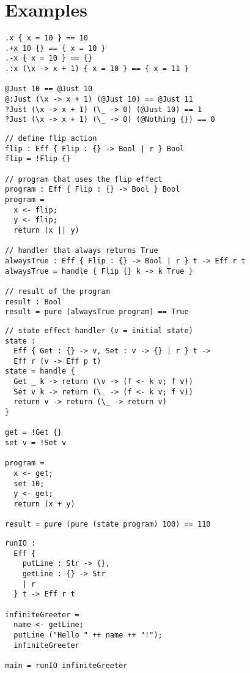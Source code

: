 \documentclass[12pt]{article}
\begin{document}
\newpage
\section{Examples}

\begin{lstlisting}[caption=Records and variants]
.x { x = 10 } == 10
.+x 10 {} == { x = 10 }
.-x { x = 10 } == {}
.:x (\x -> x + 1) { x = 10 } == { x = 11 }

@Just 10 == @Just 10
@:Just (\x -> x + 1) (@Just 10) == @Just 11
?Just (\x -> x + 1) (\_ -> 0) (@Just 10) == 1
?Just (\x -> x + 1) (\_ -> 0) (@Nothing {}) == 0
\end{lstlisting}

\begin{lstlisting}[caption=Basic effect handlers]
// define flip action
flip : Eff { Flip : {} -> Bool | r } Bool
flip = !Flip {}

// program that uses the flip effect
program : Eff { Flip : {} -> Bool } Bool
program =
  x <- flip;
  y <- flip;
  return (x || y)

// handler that always returns True
alwaysTrue : Eff { Flip : {} -> Bool | r } t -> Eff r t
alwaysTrue = handle { Flip {} k -> k True }

// result of the program
result : Bool
result = pure (alwaysTrue program) == True
\end{lstlisting}

\newpage
\begin{lstlisting}[caption=State effect]
// state effect handler (v = initial state)
state :
  Eff { Get : {} -> v, Set : v -> {} | r } t ->
  Eff r (v -> Eff p t)
state = handle {
  Get _ k -> return (\v -> (f <- k v; f v))
  Set v k -> return (\_ -> (f <- k v; f v))
  return v -> return (\_ -> return v)
}

get = !Get {}
set v = !Set v

program =
  x <- get;
  set 10;
  y <- get;
  return (x + y)

result = pure (pure (state program) 100) == 110
\end{lstlisting}

\begin{lstlisting}[caption=IO effects]
runIO :
  Eff {
    putLine : Str -> {},
    getLine : {} -> Str
    | r
  } t -> Eff r t

infiniteGreeter =
  name <- getLine;
  putLine ("Hello " ++ name ++ "!");
  infiniteGreeter

main = runIO infiniteGreeter
\end{lstlisting}
\end{document}
